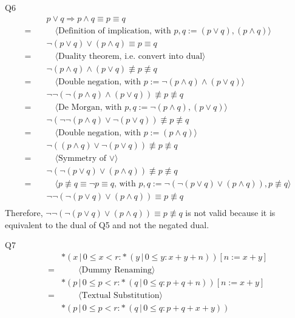 \documentclass{article}
\begin{document}
    \vspace{10mm}
    Q6
    \begin{align*}
        & \quad p \vee q  \Longrightarrow p \land q \equiv p \equiv q \\
        = & \quad\quad \langle \text{Definition of implication, with } p,q := (p \vee q),(p \land q) \rangle \\
        & \quad \neg (p \vee q) \vee (p \land q) \equiv p \equiv q \\
        = & \quad\quad \langle \text{Duality theorem, i.e. convert into dual}\rangle \\
        & \quad \neg (p \land q) \land (p \vee q) \not\equiv p \not\equiv q \\
        = & \quad\quad \langle \text{Double negation, with } p := \neg (p \land q) \land (p \vee q) \rangle \\
        & \quad \neg\neg (\neg (p \land q) \land (p \vee q)) \not\equiv p \not\equiv q \\
        = & \quad\quad \langle \text{De Morgan, with } p,q := \neg (p \land q),(p \vee q) \rangle \\
        & \quad \neg (\neg\neg (p \land q) \vee \neg(p \vee q)) \not\equiv p \not\equiv q \\
        = & \quad\quad \langle \text{Double negation, with } p := (p \land q) \rangle \\
        & \quad \neg ((p \land q) \vee \neg(p \vee q)) \not\equiv p \not\equiv q \\
        = & \quad\quad \langle \text{Symmetry of } \vee \rangle \\
        & \quad \neg (\neg(p \vee q) \vee (p \land q)) \not\equiv p \not\equiv q \\
        = & \quad\quad \langle p \not\equiv q \equiv \neg p \equiv q \text{, with } p,q := \neg (\neg(p \vee q) \vee (p \land q)),p \not\equiv q \rangle \\
        & \quad \neg\neg (\neg(p \vee q) \vee (p \land q)) \equiv p \not\equiv q \\
    \end{align*}
    Therefore, $ \neg\neg (\neg(p \vee q) \vee (p \land q)) \equiv p \not\equiv q $ is not valid because it is equivalent to the dual of Q5 and not the negated dual.

    \vspace{10mm}
    Q7
    \begin{align*}
        & * (x\, |\, 0 \leq x < r : *\, (y\, |\, 0 \leq y : x + y + n))[n := x + y] \\
        = & \quad\quad \langle \text{Dummy Renaming} \rangle \\
        & * (p\, |\, 0 \leq p < r : *\, (q\, |\, 0 \leq q : p + q + n))[n := x + y] \\
        = & \quad\quad \langle \text{Textual Substitution} \rangle \\
        & * (p\, |\, 0 \leq p < r : *\, (q\, |\, 0 \leq q : p + q + x + y)) \\
    \end{align*}
\end{document}

